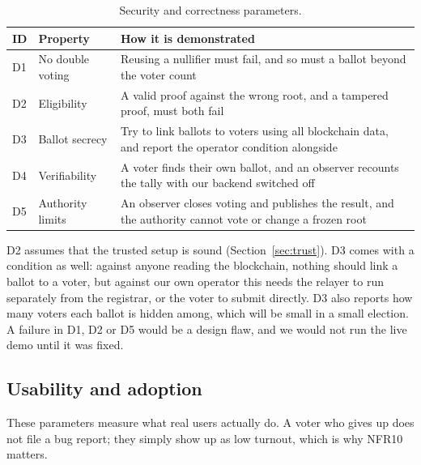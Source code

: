 \begin{table}[htbp]
  \centering
  \caption{Security and correctness parameters.}
  \label{tab:eval-sec}
  \small
  \begin{tabular}{@{}lL{4.4cm}L{10.4cm}@{}}
    \toprule
    \textbf{ID} & \textbf{Property}       & \textbf{How it is demonstrated}                                                               \\
    \midrule
    D1          & No double voting        & Reusing a nullifier must fail, and so must a ballot beyond the voter count                     \\
    D2          & Eligibility             & A valid proof against the wrong root, and a tampered proof, must both fail                     \\
    D3          & Ballot secrecy          & Try to link ballots to voters using all blockchain data, and report the operator condition alongside \\
    D4          & Verifiability           & A voter finds their own ballot, and an observer recounts the tally with our backend switched off \\
    D5          & Authority limits        & An observer closes voting and publishes the result, and the authority cannot vote or change a frozen root \\
    \bottomrule
  \end{tabular}
\end{table}

D2 assumes that the trusted setup is sound (Section~\ref{sec:trust}). D3 comes
with a condition as well: against anyone reading the blockchain, nothing should
link a ballot to a voter, but against our own operator this needs the relayer
to run separately from the registrar, or the voter to submit directly. D3 also
reports how many voters each ballot is hidden among, which will be small in a
small election. A failure in D1, D2 or D5 would be a design flaw, and we would
not run the live demo until it was fixed.

\subsection{Usability and adoption}

These parameters measure what real users actually do. A voter who gives up
does not file a bug report; they simply show up as low turnout, which is why
NFR10 matters.

